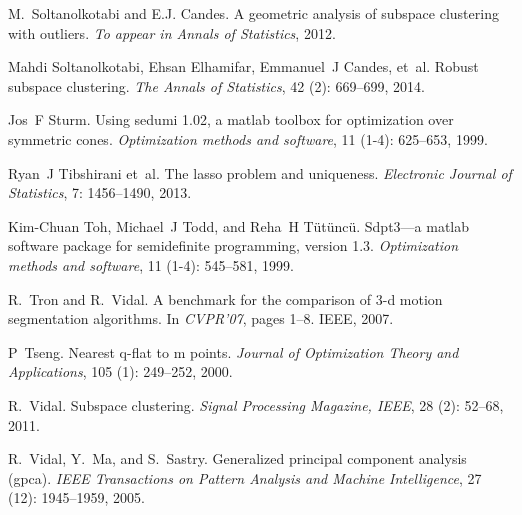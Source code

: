 \documentclass{ctexart}
\begin{document}
\begin{thebibliography}{47}
    M.~Soltanolkotabi and E.J. Candes.
    \newblock A geometric analysis of subspace clustering with outliers.
    \newblock \emph{To appear in Annals of Statistics}, 2012.

    Mahdi Soltanolkotabi, Ehsan Elhamifar, Emmanuel~J Candes, et~al.
    \newblock Robust subspace clustering.
    \newblock \emph{The Annals of Statistics}, 42 (2): 669--699,
    2014.

    Jos~F Sturm.
    \newblock Using sedumi 1.02, a matlab toolbox for optimization over symmetric
    cones.
    \newblock \emph{Optimization methods and software}, 11 (1-4):
    625--653, 1999.

    Ryan~J Tibshirani et~al.
    \newblock The lasso problem and uniqueness.
    \newblock \emph{Electronic Journal of Statistics}, 7: 1456--1490,
    2013.

    Kim-Chuan Toh, Michael~J Todd, and Reha~H T{\"u}t{\"u}nc{\"u}.
    \newblock Sdpt3—a matlab software package for semidefinite programming,
    version 1.3.
    \newblock \emph{Optimization methods and software}, 11 (1-4):
    545--581, 1999.

    R.~Tron and R.~Vidal.
    \newblock A benchmark for the comparison of 3-d motion segmentation algorithms.
    \newblock In \emph{CVPR'07}, pages 1--8. IEEE, 2007.

    P~Tseng.
    \newblock Nearest q-flat to m points.
    \newblock \emph{Journal of Optimization Theory and Applications}, 105
    (1): 249--252, 2000.

    R.~Vidal.
    \newblock Subspace clustering.
    \newblock \emph{Signal Processing Magazine, IEEE}, 28 (2):
    52--68, 2011.

    R.~Vidal, Y.~Ma, and S.~Sastry.
    \newblock Generalized principal component analysis (gpca).
    \newblock \emph{IEEE Transactions on Pattern Analysis and Machine
    Intelligence}, 27 (12): 1945--1959, 2005.


\end{thebibliography}
\end{document}
